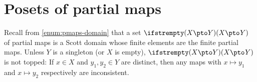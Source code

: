 \section{Posets of partial maps}\label{sec:partial-maps}

Recall from \cref{enum:pmaps-domain} that a set $\pmaps{X}{Y}$ of partial maps is a Scott domain whose finite elements are the finite partial maps. Unless $Y$ is a singleton (or $X$ is empty), $\pmaps{X}{Y}$ is not topped: If $x \in X$ and $y_1,y_2 \in Y$ are distinct, then any maps with $x \mapsto y_1$ and $x \mapsto y_2$ respectively are inconsistent.








